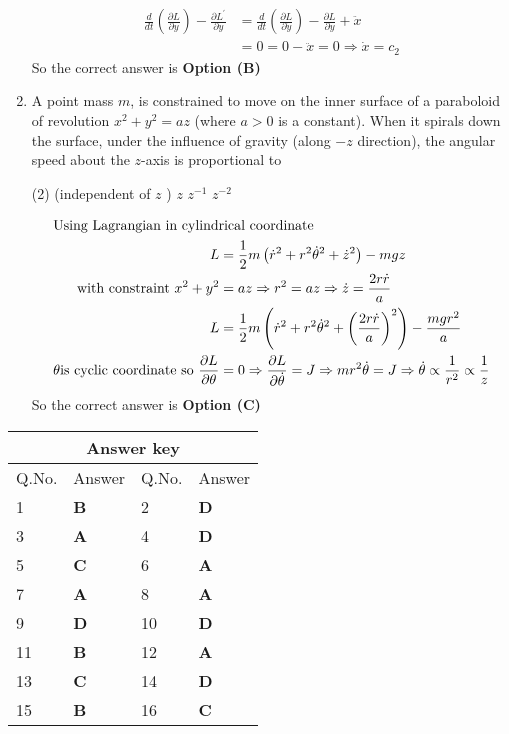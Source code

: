 \begin{enumerate}
\begin{answer}
\begin{align*}
	\frac{d}{d t}\left(\frac{\partial L}{\partial y}\right)-\frac{\partial L^{\prime}}{\partial y}&=\frac{d}{d t}\left(\frac{\partial L}{\partial \dot{y}}\right)-\frac{\partial L}{\partial y}+\ddot{x}\\&=0=0-\ddot{x}=0 \Rightarrow \dot{x}=c_{2}
	\end{align*}
	So the correct answer is \textbf{Option (B)}
\end{answer}
	\item A point mass $m$, is constrained to move on the inner surface of a paraboloid of revolution $x^{2}+y^{2}=a z$ (where $a>0$ is a constant). When it spirals down the surface, under the influence of gravity (along $-z$ direction), the angular speed about the $z$-axis is proportional to
	{}
	\begin{tasks}(2)
		 (independent of $z$ )
		\task[\textbf{B.}] $z$
		\task[\textbf{C.}]  $z^{-1}$
		\task[\textbf{D.}] $z^{-2}$
	\end{tasks}	
\begin{answer}
	\begin{align*}
	\intertext{Using Lagrangian in cylindrical coordinate}
	L&=\frac{1}{2} m\left(\dot{r}^{2}+r^{2} \dot{\theta}^{2}+\dot{z}^{2}\right)-m g z \\\text{ with constraint }x^{2}+y^{2}&=a z \Rightarrow r^{2}=a z \Rightarrow \dot{z}=\frac{2 r \dot{r}}{a}\\
	L&=\frac{1}{2} m\left(\dot{r}^{2}+r^{2} \dot{\theta}^{2}+\left(\frac{2 r \dot{r}}{a}\right)^{2}\right)-\frac{m g r^{2}}{a}\\
	\theta \text{is cyclic coordinate so }\frac{\partial L}{\partial \theta}&=0 \Rightarrow \frac{\partial L}{\partial \dot{\theta}}=J \Rightarrow m r^{2} \dot{\theta}=J \Rightarrow \dot{\theta} \propto \frac{1}{r^{2}} \propto \frac{1}{z}
	\end{align*}
	So the correct answer is \textbf{Option (C)}
\end{answer}
\end{enumerate}
\setlength\arrayrulewidth{1pt}
\begin{table}[H]
	\centering
	\begin{tabular}{|p{1.5cm}|p{1.5cm}||p{1.5cm}|p{1.5cm}|}
		\hline
		\multicolumn{4}{|c|}{\textbf{Answer key}}\\\hline\hline
		\rowcolor{ocrel}Q.No.&Answer&Q.No.&Answer\\\hline
		1&\textbf{B} &2&\textbf{D}\\\hline 
		3&\textbf{A} &4&\textbf{D} \\\hline
		5&\textbf{C} &6&\textbf{A} \\\hline
		7&\textbf{A}&8&\textbf{A}\\\hline
		9&\textbf{D}&10&\textbf{D}\\\hline
		11&\textbf{B} &12&\textbf{A}\\\hline
		13&\textbf{C}&14&\textbf{D}\\\hline
		15&\textbf{B}&16&\textbf{C}\\\hline
		
	\end{tabular}
\end{table}
